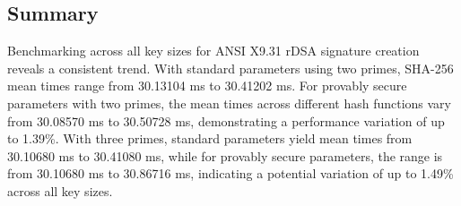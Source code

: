 \documentclass[]{final_report}
\theoremstyle{definition}
\begin{document}

\subsection*{Summary}

Benchmarking across all key sizes for ANSI X9.31 rDSA signature creation reveals a consistent trend. With standard parameters using two primes, SHA-256 mean times range from 30.13104 ms to 30.41202 ms. For provably secure parameters with two primes, the mean times across different hash functions vary from 30.08570 ms to 30.50728 ms, demonstrating a performance variation of up to 1.39\%. With three primes, standard parameters yield mean times from 30.10680 ms to 30.41080 ms, while for provably secure parameters, the range is from 30.10680 ms to 30.86716 ms, indicating a potential variation of up to 1.49\% across all key sizes.
\end{document}
